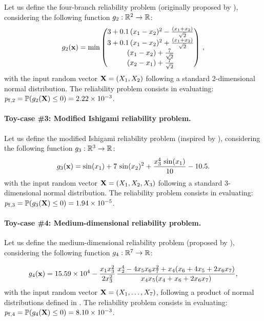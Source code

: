 Let us define the four-branch reliability problem (originally proposed by \cite{waarts2000structural}), considering the following function $g_2: \mathbb{R}^2 \rightarrow \mathbb{R}$:
\begin{align}
  g_2({\bf x}) = \min \begin{pmatrix}
    3+0.1 \, (x_1-x_2)^2-\frac{(x_1+x_2)}{\sqrt{2}}\\
    3+0.1\, (x_1-x_2)^2+\frac{(x_1+x_2)}{\sqrt{2}}\\
    (x_1-x_2)+ \frac{7}{\sqrt{2}}\\
    (x_2-x_1)+ \frac{7}{\sqrt{2}}
  \end{pmatrix}\, ,
\end{align}
with the input random vector ${\bf X} = (X_1, X_2)$ following a standard 2-dimensional normal distribution. 
The reliability problem consists in evaluating: $p_{\mathrm{f}, 2} = \mathbb{P} ( g_2({\bf X}) \leq 0 ) =  2.22 \times 10^{-3}$.

\paragraph{Toy-case \#3: Modified Ishigami reliability problem.}
Let us define the modified Ishigami reliability problem (inspired by \citealp{lemaitre_2015_PLI}), considering the following function $g_3: \mathbb{R}^3 \rightarrow \mathbb{R}$:
\begin{equation}
    g_3({\bf x}) = \sin(x_1) + 7 \, \sin(x_2)^2 + \frac{x_3^4 \, \sin(x_1)}{10} - 10.5.
\end{equation}
with the input random vector ${\bf X} = (X_1, X_2, X_3)$ following a standard 3-dimensional normal distribution. 
The reliability problem consists in evaluating: $p_{\mathrm{f}, 3} = \mathbb{P} ( g_3({\bf X}) \leq 0 ) =  1.94 \times 10^{-5}$.

\paragraph{Toy-case \#4: Medium-dimensional reliability problem.}

Let us define the medium-dimensional reliability problem (proposed by \citealp{yun2018efficient}), considering the following function $g_4 : \mathbb{R}^7 \rightarrow \mathbb{R}$:

\begin{equation}
    g_4({\bf x}) = 15.59 \times 10^4 - \frac{x_1 x_3^2}{2 x_3^2} \, \frac{x_2^4 - 4 x_5 x_6 x_7^2 + x_4 (x_6 + 4 x_5 + 2 x_6 x_7)}{x_4 x_5 (x_4 + x_6 + 2 x_6 x_7)},
\end{equation}
with the input random vector ${\bf X} = (X_1, \dots, X_7)$, following a product of normal distributions defined in \cite{yun2018efficient}. 
The reliability problem consists in evaluating: $p_{\mathrm{f}, 4} = \mathbb{P} ( g_4({\bf X}) \leq 0 ) =  8.10 \times 10^{-3}$.


